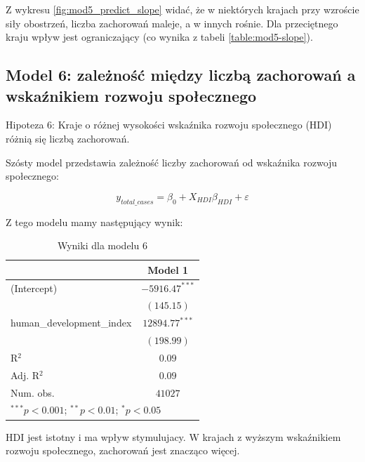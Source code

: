 \documentclass[12pt]{mwbk}
\theoremstyle{plain}
\theoremstyle{definition}
\theoremstyle{remark}
\begin{document}
Z wykresu \ref{fig:mod5_predict_slope} widać, że w niektórych krajach przy wzroście siły obostrzeń, liczba zachorowań maleje, a w innych rośnie. Dla przeciętnego kraju wpływ jest ograniczający (co wynika z tabeli \ref{table:mod5-slope}).

\newpage

\subsection{Model 6: zależność między liczbą zachorowań a wskaźnikiem rozwoju społecznego}

Hipoteza 6: Kraje o różnej wysokości wskaźnika rozwoju społecznego (HDI) różnią się liczbą zachorowań.

Szósty model przedstawia zależność liczby zachorowań od wskaźnika rozwoju społecznego:

$$y_{total\_cases}=\beta_0+X_{HDI}\beta_{HDI}+\varepsilon$$

Z tego modelu mamy następujący wynik:

\begin{table}[!htbp]
	\begin{center}
		\begin{tabular}{l c}
			\hline
			& Model 1 \\
			\hline
			(Intercept)               & $-5916.47^{***}$ \\
			& $(145.15)$       \\
			human\_development\_index & $12894.77^{***}$ \\
			& $(198.99)$       \\
			\hline
			R$^2$                     & $0.09$           \\
			Adj. R$^2$                & $0.09$           \\
			Num. obs.                 & $41027$          \\
			\hline
			\multicolumn{2}{l}{\scriptsize{$^{***}p<0.001$; $^{**}p<0.01$; $^{*}p<0.05$}}
		\end{tabular}
		\caption{Wyniki dla modelu 6}
		\label{table:mod6}
	\end{center}
\end{table}

HDI jest istotny i ma wpływ stymulujacy. W krajach z wyższym wskaźnikiem rozwoju społecznego, zachorowań jest znacząco więcej.
\end{document}
